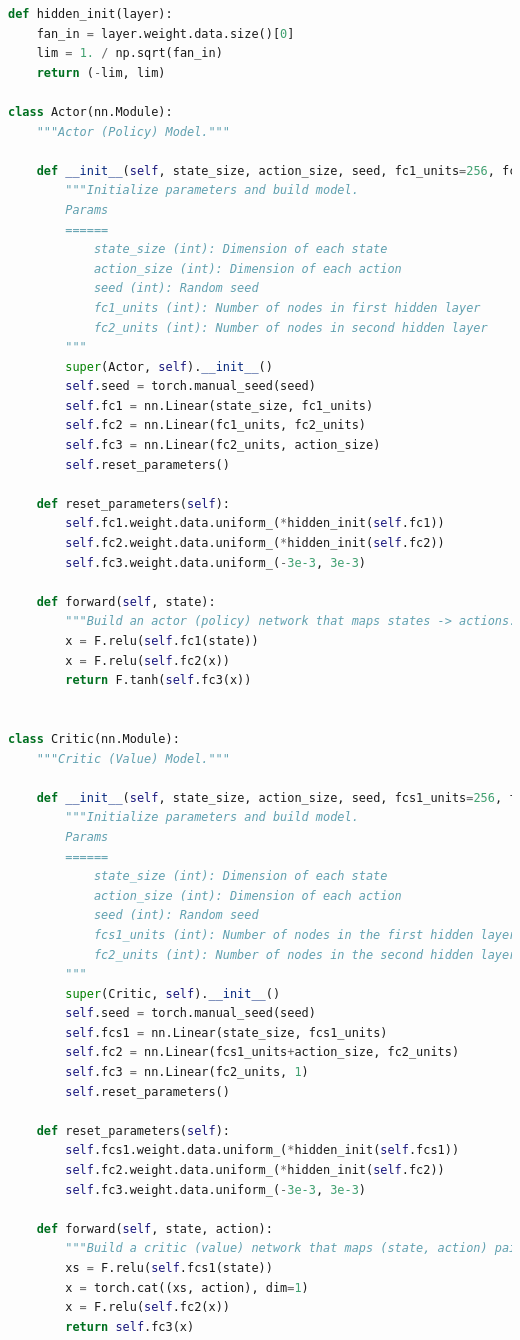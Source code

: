 \documentclass{article}
\begin{document}
\begin{lstlisting}[language=Python]
def hidden_init(layer):
    fan_in = layer.weight.data.size()[0]
    lim = 1. / np.sqrt(fan_in)
    return (-lim, lim)

class Actor(nn.Module):
    """Actor (Policy) Model."""

    def __init__(self, state_size, action_size, seed, fc1_units=256, fc2_units=256):
        """Initialize parameters and build model.
        Params
        ======
            state_size (int): Dimension of each state
            action_size (int): Dimension of each action
            seed (int): Random seed
            fc1_units (int): Number of nodes in first hidden layer
            fc2_units (int): Number of nodes in second hidden layer
        """
        super(Actor, self).__init__()
        self.seed = torch.manual_seed(seed)
        self.fc1 = nn.Linear(state_size, fc1_units)
        self.fc2 = nn.Linear(fc1_units, fc2_units)
        self.fc3 = nn.Linear(fc2_units, action_size)
        self.reset_parameters()

    def reset_parameters(self):
        self.fc1.weight.data.uniform_(*hidden_init(self.fc1))
        self.fc2.weight.data.uniform_(*hidden_init(self.fc2))
        self.fc3.weight.data.uniform_(-3e-3, 3e-3)

    def forward(self, state):
        """Build an actor (policy) network that maps states -> actions."""
        x = F.relu(self.fc1(state))
        x = F.relu(self.fc2(x))
        return F.tanh(self.fc3(x))


class Critic(nn.Module):
    """Critic (Value) Model."""

    def __init__(self, state_size, action_size, seed, fcs1_units=256, fc2_units=256):
        """Initialize parameters and build model.
        Params
        ======
            state_size (int): Dimension of each state
            action_size (int): Dimension of each action
            seed (int): Random seed
            fcs1_units (int): Number of nodes in the first hidden layer
            fc2_units (int): Number of nodes in the second hidden layer
        """
        super(Critic, self).__init__()
        self.seed = torch.manual_seed(seed)
        self.fcs1 = nn.Linear(state_size, fcs1_units)
        self.fc2 = nn.Linear(fcs1_units+action_size, fc2_units)
        self.fc3 = nn.Linear(fc2_units, 1)
        self.reset_parameters()

    def reset_parameters(self):
        self.fcs1.weight.data.uniform_(*hidden_init(self.fcs1))
        self.fc2.weight.data.uniform_(*hidden_init(self.fc2))
        self.fc3.weight.data.uniform_(-3e-3, 3e-3)

    def forward(self, state, action):
        """Build a critic (value) network that maps (state, action) pairs -> Q-values."""
        xs = F.relu(self.fcs1(state))
        x = torch.cat((xs, action), dim=1)
        x = F.relu(self.fc2(x))
        return self.fc3(x)

\end{lstlisting}
\end{document}
